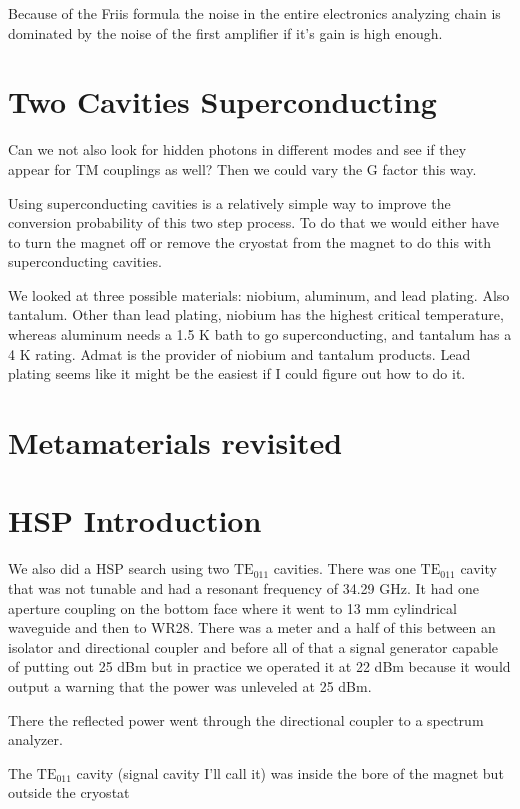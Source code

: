 \documentclass[11pt]{article}
\begin{document}
Because of the Friis formula the noise in the entire electronics analyzing chain is dominated by the noise of the first amplifier if it's gain is high enough.

\section{Two Cavities Superconducting}
Can we not also look for hidden photons in different modes and see if they appear for TM couplings as well? Then we could vary the G factor this way.

Using superconducting cavities is a relatively simple way to improve the conversion probability of this two step process. To do that we would either have to turn the magnet off or remove the cryostat from the magnet to do this with superconducting cavities.

We looked at three possible materials: niobium, aluminum, and lead plating. Also tantalum.
Other than lead plating, niobium has the highest critical temperature, whereas aluminum needs a 1.5 K bath to go superconducting, and tantalum has a 4 K rating. Admat is the provider of niobium and tantalum products.
Lead plating seems like it might be the easiest if I could figure out how to do it.

\section{Metamaterials revisited}

\section{HSP Introduction}

We also did a HSP search using two $\text{TE}_{011}$ cavities. There was one $\text{TE}_{011}$ cavity that was not tunable and had a resonant frequency of 34.29 GHz. It had one aperture coupling on the bottom face where it went to 13 mm cylindrical waveguide and then to WR28. There was a meter and a half of this between an isolator and directional coupler and before all of that a signal generator capable of putting out 25 dBm but in practice we operated it at 22 dBm because it would output a warning that the power was unleveled at 25 dBm. 

There the reflected power went through the directional coupler to a spectrum analyzer.

The $\text{TE}_{011}$ cavity (signal cavity I’ll call it) was inside the bore of the magnet but outside the cryostat
\end{document}
